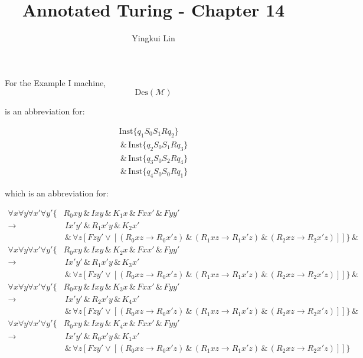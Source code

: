 \documentclass{article}
\title{Annotated Turing - Chapter 14}
\author{Yingkui Lin}
\begin{document}
For the Example I machine,
\[
\textrm{Des}(\mathcal{M})
\]

is an abbreviation for:

\begin{align*}
  \textrm{Inst}\{q_1S_0S_1Rq_2\} \\
  \,\&\, \textrm{Inst}\{q_2S_0S_1Rq_3\} \\
  \,\&\,  \textrm{Inst}\{q_3S_0S_2Rq_4\}  \\
  \,\&\, \textrm{Inst}\{q_4S_0S_0Rq_1\}   
\end{align*}

which is an abbreviation for:

\begin{align*}
  \forall x \forall y \forall x' \forall y' \{
    & R_0xy \,\&\, Ixy  \,\&\, K_1 x  \,\&\,  Fxx'  \,\&\,  Fyy' \\
    \rightarrow &\, Ix'y' \,\&\,  R_1x'y \,\&\, K_2x' \\
    & \,\&\, \forall z \left[ Fzy' \vee
      \left[
        \left( R_0xz \rightarrow R_0x'z \right) \,\&\, 
        \left( R_1xz \rightarrow R_1x'z \right) \,\&\, 
        \left( R_2xz \rightarrow R_2x'z \right)
      \right]
    \right]
  \} \,\&\, \\
  \forall x \forall y \forall x' \forall y' \{
    & R_0xy \,\&\, Ixy  \,\&\, K_2 x  \,\&\,  Fxx'  \,\&\,  Fyy' \\
    \rightarrow &\, Ix'y' \,\&\,  R_1x'y \,\&\, K_3x' \\
    & \,\&\, \forall z \left[ Fzy' \vee
      \left[
        \left( R_0xz \rightarrow R_0x'z \right) \,\&\, 
        \left( R_1xz \rightarrow R_1x'z \right) \,\&\, 
        \left( R_2xz \rightarrow R_2x'z \right)
      \right]
    \right]
  \} \,\&\, \\
  \forall x \forall y \forall x' \forall y' \{
    & R_0xy \,\&\, Ixy  \,\&\, K_3 x  \,\&\,  Fxx'  \,\&\,  Fyy' \\
    \rightarrow &\, Ix'y' \,\&\,  R_2x'y \,\&\, K_4x' \\
    & \,\&\, \forall z \left[ Fzy' \vee
      \left[
        \left( R_0xz \rightarrow R_0x'z \right) \,\&\, 
        \left( R_1xz \rightarrow R_1x'z \right) \,\&\, 
        \left( R_2xz \rightarrow R_2x'z \right)
      \right]
    \right]
  \} \,\&\, \\
  \forall x \forall y \forall x' \forall y' \{
    & R_0xy \,\&\, Ixy  \,\&\, K_4 x  \,\&\,  Fxx'  \,\&\,  Fyy' \\
    \rightarrow &\, Ix'y' \,\&\,  R_0x'y \,\&\, K_1x' \\
    & \,\&\, \forall z \left[ Fzy' \vee
      \left[
        \left( R_0xz \rightarrow R_0x'z \right) \,\&\, 
        \left( R_1xz \rightarrow R_1x'z \right) \,\&\, 
        \left( R_2xz \rightarrow R_2x'z \right)
      \right]
    \right]
  \}
\end{align*}
\end{document}

